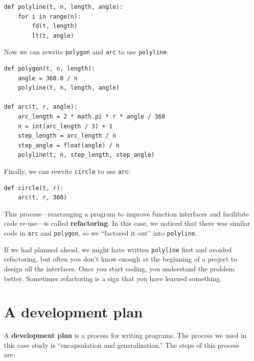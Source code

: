 \documentclass[10pt]{book}
\begin{document}
\beforeverb
\begin{verbatim}
def polyline(t, n, length, angle):
    for i in range(n):
        fd(t, length)
        lt(t, angle)
\end{verbatim}
\afterverb
%
Now we can rewrite {\tt polygon} and {\tt arc} to use {\tt polyline}:

\beforeverb
\begin{verbatim}
def polygon(t, n, length):
    angle = 360.0 / n
    polyline(t, n, length, angle)

def arc(t, r, angle):
    arc_length = 2 * math.pi * r * angle / 360
    n = int(arc_length / 3) + 1
    step_length = arc_length / n
    step_angle = float(angle) / n
    polyline(t, n, step_length, step_angle)
\end{verbatim}
\afterverb
%
Finally, we can rewrite {\tt circle} to use {\tt arc}:

\beforeverb
\begin{verbatim}
def circle(t, r):
    arc(t, r, 360)
\end{verbatim}
\afterverb
%
This process---rearranging a program to improve function
interfaces and facilitate code re-use---is called {\bf refactoring}.
In this case, we noticed that there was similar code in {\tt arc} and
{\tt polygon}, so we ``factored it out'' into {\tt polyline}.


If we had planned ahead, we might have written {\tt polyline} first
and avoided refactoring, but often you don't know enough at the
beginning of a project to design all the interfaces.  Once you start
coding, you understand the problem better.  Sometimes refactoring is a
sign that you have learned something.


\section{A development plan}

A {\bf development plan} is a process for writing programs.
The process we used
in this case study is ``encapsulation and
generalization.''  The steps of this process are:
\end{document}
